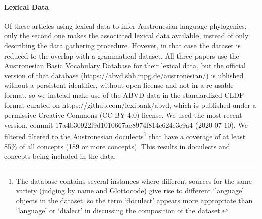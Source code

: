 \documentclass[a4paper,12pt]{scrartcl}
\begin{document}
\paragraph{Lexical Data}
Of these articles using lexical data to infer Austronesian language phylogenies, only the second one
\parencite{greenhill2018population} makes the associated lexical data available, instead of only describing the data gathering procedure.
Hovever, in that case the dataset is reduced to the overlap with a grammatical dataset.
All three papers use the Austronesian Basic Vocabulary Database for their lexical data, but the official version of that database
(https://abvd.shh.mpg.de/austronesian/) is ublished without a persistent identifier, without open license and not in a re-usable
format, so we instead make use of the ABVD
data in the standardized CLDF format \parencite{cldf} curated on https://github.com/lexibank/abvd, which is published under a
permissive Creative Commons (CC-BY-4.0) license. We used the most recent version, commit 17a4b30922f9d1010667ae8974f814c624e3e9a4
(2020-07-10). We filtered filtered to the Austronesian doculects\footnote{The database contains several instances where different
sources for the same variety (judging by name and Glottocode) give rise to different ‘language’ objects in the dataset, so the term
‘doculect’ appears more appropriate than ‘language’ or ‘dialect’ in discussing the composition of the dataset.} that have a coverage
of at least 85\% of all concepts (189 or more concepts). This results in \countlects{} doculects and \countconcepts{} concepts being included in the data.
\end{document}
